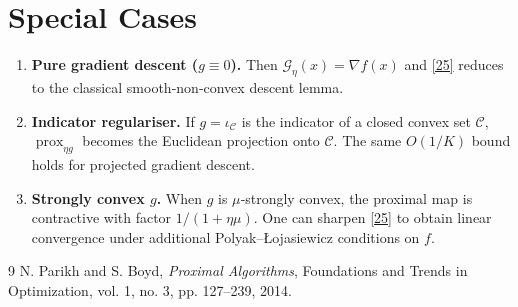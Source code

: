 \documentclass{article}
\begin{document}
\section*{Special Cases}
\begin{enumerate}[label={\arabic*.},leftmargin=*]
    \item \textbf{Pure gradient descent ($g\equiv0$).} Then $\mathcal{G}_{\eta}(x)=\nabla f(x)$ and \eqref{25} reduces to the classical smooth‑non‑convex descent lemma.
    \item \textbf{Indicator regulariser.} If $g=\iota_{\mathcal{C}}$ is the indicator of a closed convex set $\mathcal{C}$, $\operatorname{prox}_{\eta g}$ becomes the Euclidean projection onto $\mathcal{C}$. The same $O(1/K)$ bound holds for projected gradient descent.
    \item \textbf{Strongly convex $g$.} When $g$ is $\mu$‑strongly convex, the proximal map is contractive with factor $1/(1+\eta\mu)$. One can sharpen \eqref{25} to obtain linear convergence under additional Polyak–Łojasiewicz conditions on $f$.
\end{enumerate}

\begin{thebibliography}{9}
N. Parikh and S. Boyd, \emph{Proximal Algorithms}, Foundations and Trends in Optimization, vol. 1, no. 3, pp. 127–239, 2014.
\end{thebibliography}
\end{document}
